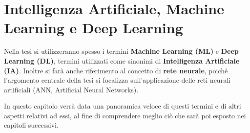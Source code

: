 \chapter{Intelligenza Artificiale, Machine Learning e Deep Learning}
Nella tesi si utilizzeranno spesso i termini \textbf{Machine Learning (ML)} e 
\textbf{Deep Learning (DL)}, termini utilizzati come sinonimi di 
\textbf{Intelligenza Artificiale (IA)}.
Inoltre si farà anche riferimento al concetto di  
\textbf{rete neurale}, poiché l'argomento centrale della tesi si focalizza 
sull'applicazione delle reti neurali artificiali (ANN, Artificial Neural Networks).

In questo capitolo verrà data una panoramica veloce di questi termini e di altri 
aspetti relativi ad essi, al fine di comprendere meglio ciò che sarà poi esposto nei 
capitoli successivi.
